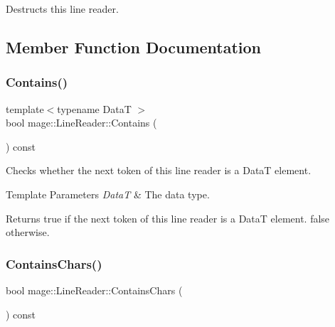 Destructs this line reader. 

\subsection{Member Function Documentation}
\mbox{\label{classmage_1_1_line_reader_a3401db2b0ecd15d8048a1b321eceb77a}} 
\subsubsection{\texorpdfstring{Contains()}{Contains()}}
{\footnotesize\ttfamily template$<$typename DataT $>$ \\
bool mage\+::\+Line\+Reader\+::\+Contains (\begin{DoxyParamCaption}{ }\end{DoxyParamCaption}) const\hspace{0.3cm}{\ttfamily [protected]}}

Checks whether the next token of this line reader is a {\ttfamily DataT} element.


\begin{DoxyTemplParams}{Template Parameters}
{\em DataT} & The data type. \\
\hline
\end{DoxyTemplParams}
\begin{DoxyReturn}{Returns}
{\ttfamily true} if the next token of this line reader is a {\ttfamily DataT} element. {\ttfamily false} otherwise. 
\end{DoxyReturn}
\mbox{\label{classmage_1_1_line_reader_a0369e06fa3b38ecb22ffd5892759225f}} 
\subsubsection{\texorpdfstring{Contains\+Chars()}{ContainsChars()}}
{\footnotesize\ttfamily bool mage\+::\+Line\+Reader\+::\+Contains\+Chars (\begin{DoxyParamCaption}{ }\end{DoxyParamCaption}) const\hspace{0.3cm}{\ttfamily [protected]}}

